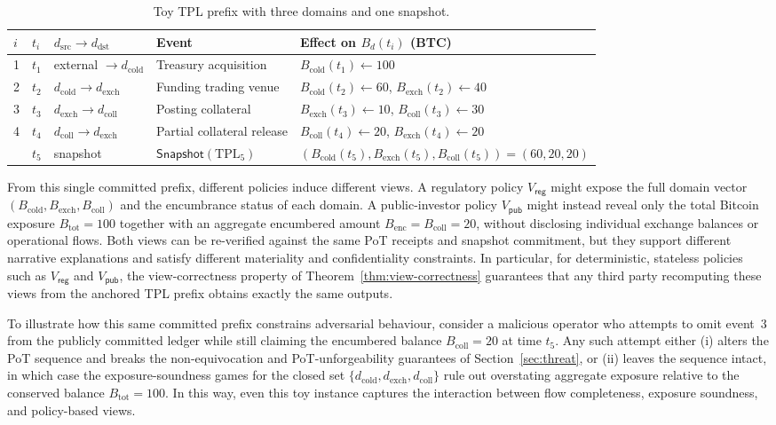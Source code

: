 \documentclass[11pt]{article}
\begin{document}
\begin{table}[H]
\centering
\begin{tabular}{lllll}
\hline
$i$ & $t_i$ & $d_{\mathrm{src}} \rightarrow d_{\mathrm{dst}}$ & Event & Effect on $B_d(t_i)$ (BTC) \\
\hline
1 & $t_1$ & external $\rightarrow d_{\mathrm{cold}}$ & Treasury acquisition & $B_{\mathrm{cold}}(t_1) \gets 100$ \\
2 & $t_2$ & $d_{\mathrm{cold}} \rightarrow d_{\mathrm{exch}}$ & Funding trading venue & $B_{\mathrm{cold}}(t_2) \gets 60$, $B_{\mathrm{exch}}(t_2) \gets 40$ \\
3 & $t_3$ & $d_{\mathrm{exch}} \rightarrow d_{\mathrm{coll}}$ & Posting collateral & $B_{\mathrm{exch}}(t_3) \gets 10$, $B_{\mathrm{coll}}(t_3) \gets 30$ \\
4 & $t_4$ & $d_{\mathrm{coll}} \rightarrow d_{\mathrm{exch}}$ & Partial collateral release & $B_{\mathrm{coll}}(t_4) \gets 20$, $B_{\mathrm{exch}}(t_4) \gets 20$ \\
\hline
 & $t_5$ & snapshot & $\mathsf{Snapshot}(\mathrm{TPL}_5)$ & $(B_{\mathrm{cold}}(t_5),B_{\mathrm{exch}}(t_5),B_{\mathrm{coll}}(t_5))=(60,20,20)$ \\
\hline
\end{tabular}
\caption{Toy TPL prefix with three domains and one snapshot.}
\label{tab:toy-tpl}
\end{table}

From this single committed prefix, different policies induce different views.
A regulatory policy $V_{\mathsf{reg}}$ might expose the full domain vector $(B_{\mathrm{cold}},B_{\mathrm{exch}},B_{\mathrm{coll}})$ and the encumbrance status of each domain.
A public-investor policy $V_{\mathsf{pub}}$ might instead reveal only
the total Bitcoin exposure $B_{\mathrm{tot}} = 100$ together with an aggregate encumbered amount $B_{\mathrm{enc}} = B_{\mathrm{coll}} = 20$,
without disclosing individual exchange balances or operational flows.
Both views can be re-verified against the same PoT receipts and snapshot commitment, but they support different narrative explanations and satisfy different materiality and confidentiality constraints.
In particular, for deterministic, stateless policies such as $V_{\mathsf{reg}}$ and $V_{\mathsf{pub}}$, the view-correctness
property of Theorem~\ref{thm:view-correctness} guarantees that any third party recomputing these views from the anchored
TPL prefix obtains exactly the same outputs.

To illustrate how this same committed prefix constrains adversarial behaviour,
consider a malicious operator who attempts to omit event~3 from the publicly committed ledger while
still claiming the encumbered balance $B_{\mathrm{coll}} = 20$ at time $t_5$.
Any such attempt either (i) alters the PoT sequence and breaks the non-equivocation and PoT-unforgeability
guarantees of Section~\ref{sec:threat}, or (ii) leaves the sequence intact, in which case the exposure-soundness
games for the closed set $\{d_{\mathrm{cold}},d_{\mathrm{exch}},d_{\mathrm{coll}}\}$ rule out overstating
aggregate exposure relative to the conserved balance $B_{\mathrm{tot}} = 100$.
In this way, even this toy instance captures the interaction between flow completeness, exposure soundness,
and policy-based views.
\end{document}
